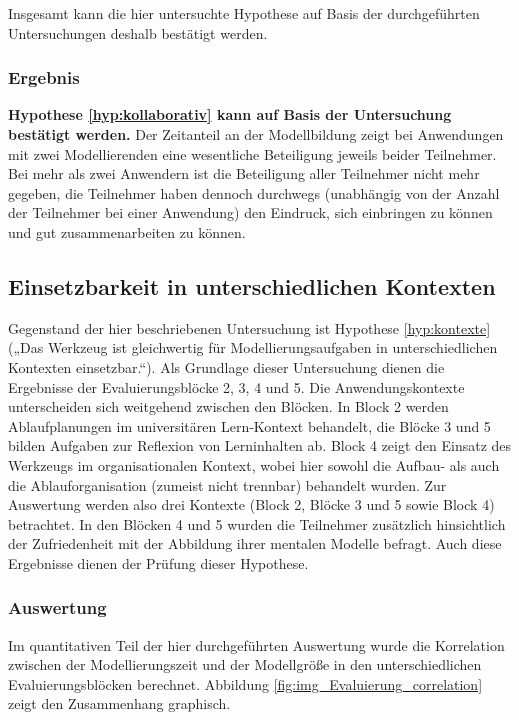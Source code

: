 Insgesamt kann die hier untersuchte Hypothese auf Basis der durchgeführten Untersuchungen deshalb bestätigt werden.

\subsubsection{Ergebnis} %

\textbf{Hypothese \ref{hyp:kollaborativ} kann auf Basis der Untersuchung bestätigt werden.} Der Zeitanteil an der Modellbildung zeigt bei Anwendungen mit zwei Modellierenden eine wesentliche Beteiligung jeweils beider Teilnehmer. Bei mehr als zwei Anwendern ist die Beteiligung aller Teilnehmer nicht mehr gegeben, die Teilnehmer haben dennoch durchwegs (unabhängig von der Anzahl der Teilnehmer bei einer Anwendung) den Eindruck, sich einbringen zu können und gut zusammenarbeiten zu können.


\subsection{Einsetzbarkeit in unterschiedlichen Kontexten} %
\label{sub:einsetzbarkeit_in_unterschiedlichen_kontexten}

Gegenstand der hier beschriebenen Untersuchung ist Hypothese \ref{hyp:kontexte} („Das Werkzeug ist gleichwertig für Modellierungsaufgaben in unterschiedlichen Kontexten einsetzbar.“). Als Grundlage dieser Untersuchung dienen die Ergebnisse der Evaluierungsblöcke 2, 3, 4 und 5. Die Anwendungskontexte unterscheiden sich weitgehend zwischen den Blöcken. In Block 2 werden Ablaufplanungen im universitären Lern-Kontext behandelt, die Blöcke 3 und 5 bilden Aufgaben zur Reflexion von Lerninhalten ab. Block 4 zeigt den Einsatz des Werkzeugs im organisationalen Kontext, wobei hier sowohl die Aufbau- als auch die Ablauforganisation (zumeist nicht trennbar) behandelt wurden. Zur Auswertung werden also drei Kontexte (Block 2, Blöcke 3 und 5 sowie Block 4) betrachtet. In den Blöcken 4 und 5 wurden die Teilnehmer zusätzlich hinsichtlich der Zufriedenheit mit der Abbildung ihrer mentalen Modelle befragt. Auch diese Ergebnisse dienen der Prüfung dieser Hypothese.

\subsubsection{Auswertung} 

Im quantitativen Teil der hier durchgeführten Auswertung wurde die Korrelation zwischen der Modellierungszeit und der Modellgröße in den unterschiedlichen Evaluierungsblöcken berechnet. Abbildung \ref{fig:img_Evaluierung_correlation} zeigt den Zusammenhang graphisch.

